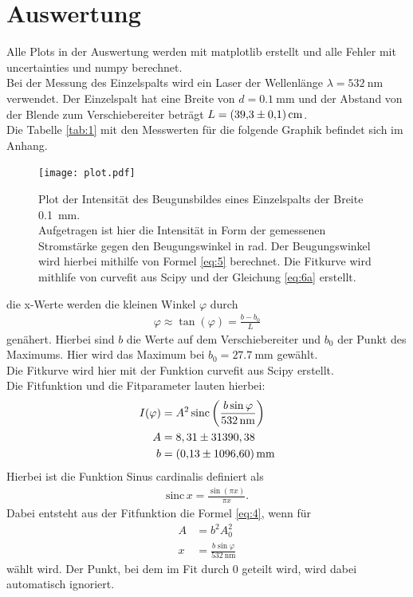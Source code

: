 \section{Auswertung}
Alle Plots in der Auswertung werden mit matplotlib \cite{matplotlib} erstellt und alle
Fehler mit uncertainties \cite{uncertainties} und numpy \cite{numpy} berechnet.\\
Bei der Messung des Einzelspalts wird ein Laser der Wellenlänge $\lambda = \SI{532}{\nano\meter} $ verwendet.
Der Einzelspalt hat eine Breite von $d=\SI{0.1}{\milli\meter} $ und der Abstand von 
der Blende zum Verschiebereiter beträgt $L=\SI{39.3+-0.1}{\centi\meter} $.\\
Die Tabelle \ref{tab:1} mit den Messwerten für die folgende Graphik befindet sich im Anhang.
\begin{figure}[H]
    \centering
    \texttt{[image: plot.pdf]}
    \caption{
        Plot der Intensität des Beugunsbildes eines Einzelspalts der Breite \SI{0.1}{\milli\meter}.\cite{matplotlib}\\
        Aufgetragen ist hier die Intensität in Form der gemessenen Stromstärke
        gegen den Beugungswinkel \varphi in rad. Der Beugungswinkel wird hierbei mithilfe von
        Formel \eqref{eq:5} berechnet. Die Fitkurve wird mithlife von curvefit aus Scipy \cite{scipy}
        und der Gleichung \eqref{eq:6a} erstellt. 
    } 
    \label{fig:4} 
\end{figure}
\justifying die x-Werte werden die kleinen Winkel $\varphi$ durch 
\begin{align}
    \varphi \approx \tan (\varphi) = \frac{b-b_0}{L} \label{eq:5}
\end{align}
genähert. Hierbei sind $b$ die Werte auf dem Verschiebereiter und $b_0$ der Punkt des Maximums.
Hier wird das Maximum bei $b_0= \SI{27.7}{\milli\meter} $ gewählt.\\
Die Fitkurve wird hier mit der Funktion curvefit aus Scipy \cite{scipy} erstellt.\\
Die Fitfunktion und die Fitparameter lauten hierbei:
\begin{subequations}
\begin{align}
    I(\varphi) &= A^2 \,\text{sinc} \left(\frac{b \sin{\varphi}}{\SI{532}{\nano\meter}} \right) \label{eq:6a}\\
    A &= 8,31 \pm 31390,38 \label{eq:6b}\\
    b &= \SI{0.13+-1096.6}{\milli\meter} \label{eq:6c}
\end{align}
\end{subequations}
Hierbei ist die Funktion Sinus cardinalis definiert als
\begin{align}
    \text{sinc}\,x = \frac{\sin (\pi x)}{\pi x} \label{eq:7} .
\end{align}
Dabei entsteht aus der Fitfunktion die Formel \eqref{eq:4}, wenn für
\begin{align}
    A &= b^2 A_0^2 \label{eq:8} \\
    x &= \frac{b \sin{\varphi}}{\SI{532}{\nano\meter}} \label{eq:9}
\end{align}
wählt wird.
Der Punkt, bei dem im Fit durch 0 geteilt wird, wird dabei automatisch ignoriert.



